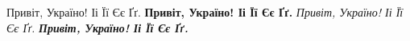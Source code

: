 \documentclass{article}
\begin{document}
Привіт, Україно! Іі Її Єє Ґґ.
\textbf{Привіт, Україно! Іі Її Єє Ґґ.}
\textit{Привіт, Україно! Іі Її Єє Ґґ.}
\textbf{\textit{Привіт, Україно! Іі Її Єє Ґґ.}}
\end{document}
